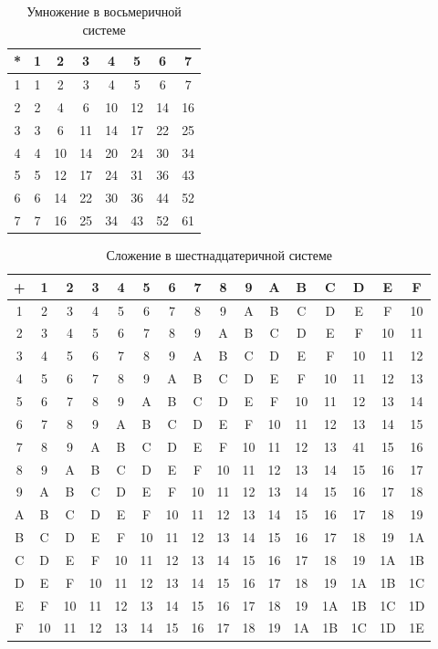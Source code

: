 \documentclass[a4paper]{article}
\begin{document}
\begin{table}[h]
  \caption{Умножение в восьмеричной системе}
  \begin{center}\label{tab:octmul}
\begin{tabular}{|c|c|c|c|c|c|c|c|}
\hline
{*} & 1 & 2 & 3 & 4 & 5 & 6 & 7\tabularnewline
\hline
1 & 1 & 2 & 3 & 4 & 5 & 6 & 7\tabularnewline
\hline
2 & 2 & 4 & 6 & 10 & 12 & 14 & 16\tabularnewline
\hline
3 & 3 & 6 & 11 & 14 & 17 & 22 & 25\tabularnewline
\hline
4 & 4 & 10 & 14 & 20 & 24 & 30 & 34\tabularnewline
\hline
5 & 5 & 12 & 17 & 24 & 31 & 36 & 43\tabularnewline
\hline
6 & 6 & 14 & 22 & 30 & 36 & 44 & 52\tabularnewline
\hline
7 & 7 & 16 & 25 & 34 & 43 & 52 & 61\tabularnewline
\hline
\end{tabular}
\end{center}
\end{table}

\begin{table}[h!]
  \caption{Сложение в шестнадцатеричной системе}
  \begin{center}\label{tab:hexsum}
\begin{tabular}{|c|c|c|c|c|c|c|c|c|c|c|c|c|c|c|c|}
\hline
+ & 1 & 2 & 3 & 4 & 5 & 6 & 7 & 8 & 9 & A & B & C & D & E & F\tabularnewline
\hline
1 & 2 & 3 & 4 & 5 & 6 & 7 & 8 & 9 & A & B & C & D & E & F & 10\tabularnewline
\hline
2 & 3 & 4 & 5 & 6 & 7 & 8 & 9 & A & B & C & D & E & F & 10 & 11\tabularnewline
\hline
3 & 4 & 5 & 6 & 7 & 8 & 9 & A & B & C & D & E & F & 10 & 11 & 12\tabularnewline
\hline
4 & 5 & 6 & 7 & 8 & 9 & A & B & C & D & E & F & 10 & 11 & 12 & 13\tabularnewline
\hline
5 & 6 & 7 & 8 & 9 & A & B & C & D & E & F & 10 & 11 & 12 & 13 & 14\tabularnewline
\hline
6 & 7 & 8 & 9 & A & B & C & D & E & F & 10 & 11 & 12 & 13 & 14 & 15\tabularnewline
\hline
7 & 8 & 9 & A & B & C & D & E & F & 10 & 11 & 12 & 13 & 41 & 15 & 16\tabularnewline
\hline
8 & 9 & A & B & C & D & E & F & 10 & 11 & 12 & 13 & 14 & 15 & 16 & 17\tabularnewline
\hline
9 & A & B & C & D & E & F & 10 & 11 & 12 & 13 & 14 & 15 & 16 & 17 & 18\tabularnewline
\hline
A & B & C & D & E & F & 10 & 11 & 12 & 13 & 14 & 15 & 16 & 17 & 18 & 19\tabularnewline
\hline
B & C & D & E & F & 10 & 11 & 12 & 13 & 14 & 15 & 16 & 17 & 18 & 19 & 1A\tabularnewline
\hline
C & D & E & F & 10 & 11 & 12 & 13 & 14 & 15 & 16 & 17 & 18 & 19 & 1A & 1B\tabularnewline
\hline
D & E & F & 10 & 11 & 12 & 13 & 14 & 15 & 16 & 17 & 18 & 19 & 1A & 1B & 1C\tabularnewline
\hline
E & F & 10 & 11 & 12 & 13 & 14 & 15 & 16 & 17 & 18 & 19 & 1A & 1B & 1C & 1D\tabularnewline
\hline
F & 10 & 11 & 12 & 13 & 14 & 15 & 16 & 17 & 18 & 19 & 1A & 1B & 1C & 1D & 1E\tabularnewline
\hline
\end{tabular}
\end{center}
\end{table}
\end{document}
